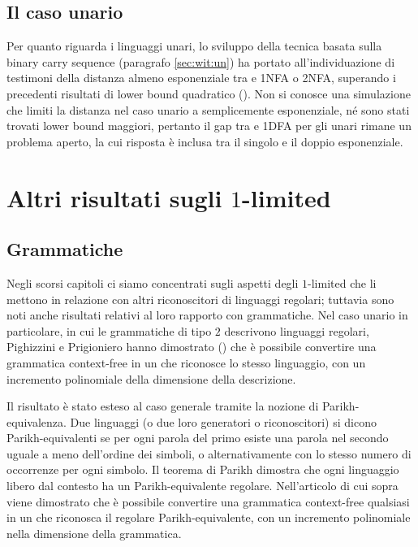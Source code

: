 \subsection{Il caso unario}
Per quanto riguarda i linguaggi unari, lo sviluppo della tecnica basata sulla binary carry sequence (paragrafo \ref{sec:wit:un}) ha portato all'individuazione di testimoni della distanza almeno esponenziale tra  e 1NFA o 2NFA, superando i precedenti risultati di lower bound quadratico (\cite{Pighizzini:14:limitedRE}). Non si conosce una simulazione che limiti la distanza nel caso unario a semplicemente esponenziale, né sono stati trovati lower bound maggiori, pertanto il gap tra  e 1DFA per gli unari rimane un problema aperto, la cui risposta è inclusa tra il singolo e il doppio esponenziale.



\section{Altri risultati sugli \texorpdfstring{$1$-limited}{1-limited}}


\subsection{Grammatiche}
Negli scorsi capitoli ci siamo concentrati sugli aspetti degli $1$-limited che li mettono in relazione con altri riconoscitori di linguaggi regolari; tuttavia sono noti anche risultati relativi al loro rapporto con grammatiche. Nel caso unario in particolare, in cui le grammatiche di tipo $2$ descrivono linguaggi regolari, Pighizzini e Prigioniero hanno dimostrato (\cite{Pighizzini:19:limitedunary}) che è possibile convertire una grammatica context-free in un  che riconosce lo stesso linguaggio, con un incremento polinomiale della dimensione della descrizione.

Il risultato è stato esteso al caso generale tramite la nozione di Parikh-equivalenza. Due linguaggi (o due loro generatori o riconoscitori) si dicono Parikh-equivalenti se per ogni parola del primo esiste una parola nel secondo uguale a meno dell'ordine dei simboli, o alternativamente con lo stesso numero di occorrenze per ogni simbolo. Il teorema di Parikh dimostra che ogni linguaggio libero dal contesto ha un Parikh-equivalente regolare. Nell'articolo di cui sopra viene dimostrato che è possibile convertire una grammatica context-free qualsiasi in un  che riconosca il regolare Parikh-equivalente, con un incremento polinomiale nella dimensione della grammatica.


